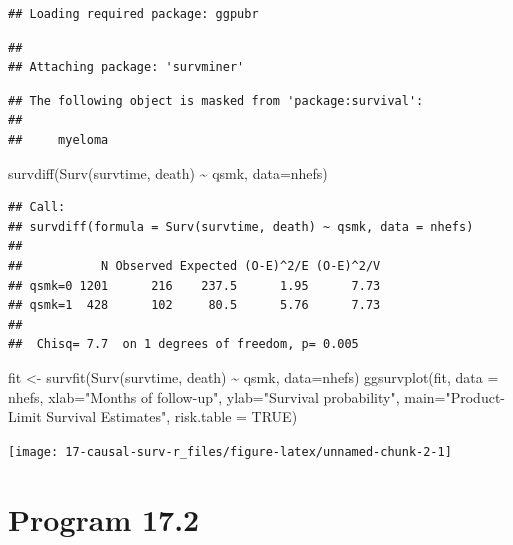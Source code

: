 \documentclass[
  10pt,
]{book}
\newenvironment{Shaded}{\begin{snugshade}}{\end{snugshade}}
\newcommand{\AttributeTok}[1]{\textcolor[rgb]{0.77,0.63,0.00}{#1}}
\newcommand{\ConstantTok}[1]{\textcolor[rgb]{0.00,0.00,0.00}{#1}}
\newcommand{\FunctionTok}[1]{\textcolor[rgb]{0.00,0.00,0.00}{#1}}
\newcommand{\NormalTok}[1]{#1}
\newcommand{\OtherTok}[1]{\textcolor[rgb]{0.56,0.35,0.01}{#1}}
\newcommand{\SpecialCharTok}[1]{\textcolor[rgb]{0.00,0.00,0.00}{#1}}
\newcommand{\StringTok}[1]{\textcolor[rgb]{0.31,0.60,0.02}{#1}}
\begin{document}
\begin{verbatim}
## Loading required package: ggpubr
\end{verbatim}

\begin{verbatim}
## 
## Attaching package: 'survminer'
\end{verbatim}

\begin{verbatim}
## The following object is masked from 'package:survival':
## 
##     myeloma
\end{verbatim}

\begin{Shaded}
\begin{Highlighting}[]
\FunctionTok{survdiff}\NormalTok{(}\FunctionTok{Surv}\NormalTok{(survtime, death) }\SpecialCharTok{\textasciitilde{}}\NormalTok{ qsmk, }\AttributeTok{data=}\NormalTok{nhefs)}
\end{Highlighting}
\end{Shaded}

\begin{verbatim}
## Call:
## survdiff(formula = Surv(survtime, death) ~ qsmk, data = nhefs)
## 
##           N Observed Expected (O-E)^2/E (O-E)^2/V
## qsmk=0 1201      216    237.5      1.95      7.73
## qsmk=1  428      102     80.5      5.76      7.73
## 
##  Chisq= 7.7  on 1 degrees of freedom, p= 0.005
\end{verbatim}

\begin{Shaded}
\begin{Highlighting}[]
\NormalTok{fit }\OtherTok{\textless{}{-}} \FunctionTok{survfit}\NormalTok{(}\FunctionTok{Surv}\NormalTok{(survtime, death) }\SpecialCharTok{\textasciitilde{}}\NormalTok{ qsmk, }\AttributeTok{data=}\NormalTok{nhefs)}
\FunctionTok{ggsurvplot}\NormalTok{(fit, }\AttributeTok{data =}\NormalTok{ nhefs, }\AttributeTok{xlab=}\StringTok{"Months of follow{-}up"}\NormalTok{,}
           \AttributeTok{ylab=}\StringTok{"Survival probability"}\NormalTok{,}
           \AttributeTok{main=}\StringTok{"Product{-}Limit Survival Estimates"}\NormalTok{, }\AttributeTok{risk.table =} \ConstantTok{TRUE}\NormalTok{)}
\end{Highlighting}
\end{Shaded}

\begin{center}\texttt{[image: 17-causal-surv-r\_files/figure-latex/unnamed-chunk-2-1]} \end{center}

\hypertarget{program-17.2}{%
\section{Program 17.2}\label{program-17.2}}
\end{document}
